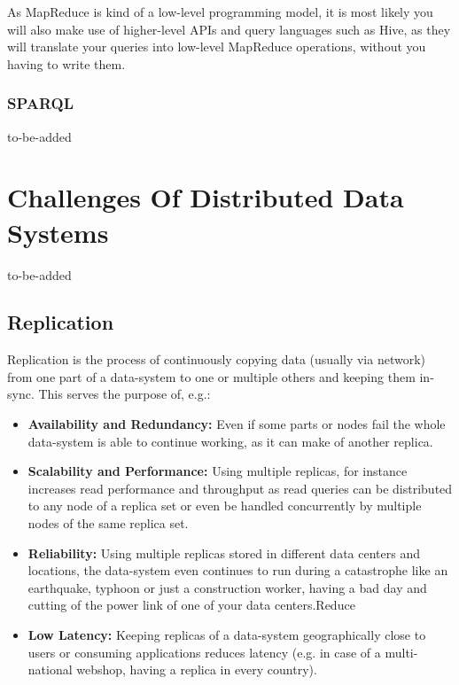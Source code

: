 {As MapReduce is kind of a low-level programming model, it is most likely you will also make use of higher-level APIs and query languages such as Hive, as they will translate your queries into low-level MapReduce operations, without you having to write them. 


\subsubsection{SPARQL}
\label{tf_dma_dataaccess_sparql}
to-be-added
\newpage

\section{Challenges Of Distributed Data Systems}
\label{tf_dds}
to-be-added

\subsection{Replication}
\label{tf_dds_replication}
Replication is the process of continuously copying data (usually via network) from one part of a data-system to one or multiple others and keeping them in-sync. This serves the purpose of, e.g.:
\begin{itemize}
\item \textbf{Availability and Redundancy:} Even if some parts or nodes fail the whole data-system is able to continue working, as it can make of another replica.
\item \textbf{Scalability and Performance:} Using multiple replicas, for instance increases read performance and throughput as read queries can be distributed to any node of a replica set or even be handled concurrently by multiple nodes of the same replica set.
\item \textbf{Reliability:} Using multiple replicas stored in different data centers and locations, the data-system even continues to run during a catastrophe like an earthquake, typhoon or just a construction worker, having a bad day and cutting of the power link of one of your data centers.Reduce 
\item \textbf{Low Latency: } Keeping replicas of a data-system geographically close to users or consuming applications reduces latency (e.g. in case of a multi-national webshop, having a replica in every country). \\
\end{itemize}

}
